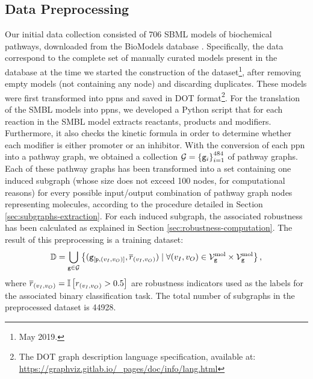 \subsection{Data Preprocessing}\label{subsec:data-collection}
Our initial data collection consisted of 706 SBML models of biochemical pathways, downloaded from the BioModels database \cite{le2006biomodels}. Specifically, the data correspond to the complete set of manually curated models present in the database at the time we started the construction of the dataset\footnote{May 2019.}, after removing empty models (not containing any node) and discarding duplicates. These models were first transformed into \glspl{ppn} and saved in DOT format\footnote{The DOT graph description language specification, available at: \url{https://graphviz.gitlab.io/_pages/doc/info/lang.html}}. For the translation of the SMBL models into \glspl{ppn}, we developed a Python script that for each reaction in the SMBL model extracts reactants, products and modifiers. Furthermore, it also checks the kinetic formula in order to determine whether each modifier is either promoter or an inhibitor. With the conversion of each \gls{ppn} into a pathway graph, we obtained a collection $\Cal{G} = \Set{\Graph{g}_i}_{i=1}^{484}$ of pathway graphs. Each of these pathway graphs has been transformed into a set containing one induced subgraph (whose size does not exceed 100 nodes, for computational reasons) for every possible input/output combination of pathway graph nodes representing molecules, according to the procedure detailed in Section \ref{sec:subgraphs-extraction}. For each induced subgraph, the associated robustness has been calculated as explained in Section \ref{sec:robustness-computation}. The result of this preprocessing is a training dataset:
$$\Data = \bigcup\limits_{\Graph{g} \in \Cal{G}} \Set{(\InducedSubgraph{g}{\Graph{p}, (v_I,v_O)}, \Robustness) \mid \forall (v_I,v_O) \in \MolNodes{g} \times \MolNodes{g}},$$
where $\overline{r}_{(v_I,v_O)} = \mathbb{I}\left[ r_{(v_I,v_O)} > 0.5 \right]$ are robustness indicators used as the labels for the associated binary classification task. The total number of subgraphs in the preprocessed dataset is 44928.

